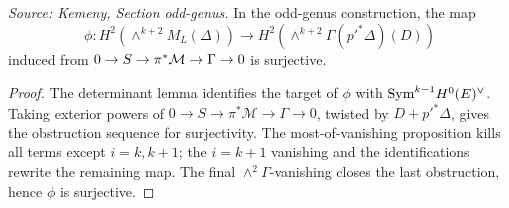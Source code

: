 \begin{proposition}
  \label{prop:kemeny_odd_phi_surjective}
  \textit{Source: Kemeny, Section odd-genus.}
  In the odd-genus construction, the map
  \[
    \phi:H^2(\wedge^{k+2}M_L(\Delta))\to
    H^2(\wedge^{k+2}\Gamma(p'^*\Delta)(D))
  \]
  induced from \(0\to S\to\pi^*\mathcal{M}\to\Gamma\to0\) is surjective.
  \end{proposition}
\begin{proof}
  The determinant lemma identifies the target of \(\phi\) with
  \(\mathrm{Sym}^{k-1}H^0(E)^\vee\).  Taking exterior powers of
  \(0\to S\to\pi^*\mathcal M\to\Gamma\to0\), twisted by \(D+p'^*\Delta\), gives
  the obstruction sequence for surjectivity.  The most-of-vanishing proposition
  kills all terms except \(i=k,k+1\); the \(i=k+1\) vanishing and the
  identifications rewrite the remaining map.  The final
  \(\wedge^2\Gamma\)-vanishing closes the last obstruction, hence \(\phi\) is
  surjective.
\end{proof}

